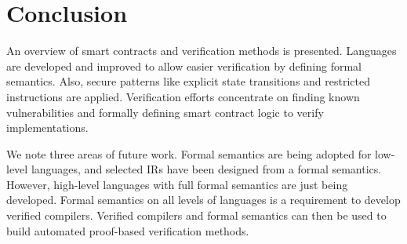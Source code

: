 \section{Conclusion}
\label{conclusion}
An overview of smart contracts and verification methods is presented.
Languages are developed and improved to allow easier verification by defining formal semantics. Also, secure patterns like explicit state transitions and restricted instructions are applied. Verification efforts concentrate on finding known vulnerabilities and formally defining smart contract logic to verify implementations.

We note three areas of future work. Formal semantics are being adopted for low-level languages, and selected IRs have been designed from a formal semantics. However, high-level languages with full formal semantics are just being developed.
Formal semantics on all levels of languages is a requirement to develop verified compilers. Verified compilers and formal semantics can then be used to build automated proof-based verification methods.

